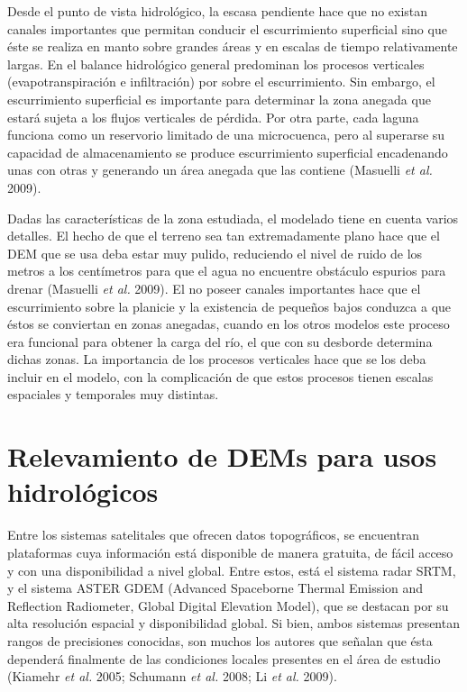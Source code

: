 \documentclass[10pt,a4paper, twoside]{report}
\begin{document}
Desde el punto de vista hidrológico, la escasa pendiente hace que no existan canales importantes que permitan conducir el escurrimiento superficial sino que éste se realiza en manto sobre grandes áreas y en escalas de tiempo relativamente largas. En el balance hidrológico general predominan los procesos verticales (evapotranspiración e infiltración) por sobre el escurrimiento. Sin embargo, el escurrimiento superficial es importante para determinar la zona anegada que estará sujeta a los flujos verticales de pérdida. Por otra parte, cada laguna funciona como un reservorio limitado de una microcuenca, pero al superarse su capacidad de almacenamiento se produce escurrimiento superficial encadenando unas con otras y generando un área anegada que las contiene (Masuelli \textit{et al.} 2009).

Dadas las características de la zona estudiada, el modelado tiene en cuenta varios detalles. El hecho de que el terreno sea tan extremadamente plano hace que el DEM que se usa deba estar muy pulido, reduciendo el nivel de ruido de los metros a los centímetros para que el agua no encuentre obstáculo espurios para drenar (Masuelli \textit{et al.} 2009). El no poseer canales importantes hace que el escurrimiento sobre la planicie y la existencia de pequeños bajos conduzca a que éstos se conviertan en zonas anegadas, cuando en los otros modelos este proceso era funcional para obtener la carga del río, el que con su desborde determina dichas zonas. La importancia de los procesos verticales hace que se los deba incluir en el modelo, con la complicación de que estos procesos tienen escalas espaciales y temporales muy distintas.






\section{Relevamiento de DEMs para usos hidrológicos}


Entre los sistemas satelitales que ofrecen datos topográficos, se encuentran plataformas cuya información está disponible de manera gratuita, de fácil acceso y con una disponibilidad a nivel global. Entre estos, está el sistema radar SRTM, y el sistema ASTER GDEM (Advanced Spaceborne Thermal Emission and Reflection Radiometer, Global Digital Elevation Model), que se destacan por su alta resolución espacial y disponibilidad global. Si bien, ambos sistemas presentan rangos de precisiones conocidas, son muchos los autores que señalan que ésta dependerá finalmente de las condiciones locales presentes en el área de estudio (Kiamehr \textit{et al.} 2005; Schumann \textit{et al.} 2008; Li \textit{et al.} 2009).
\end{document}
